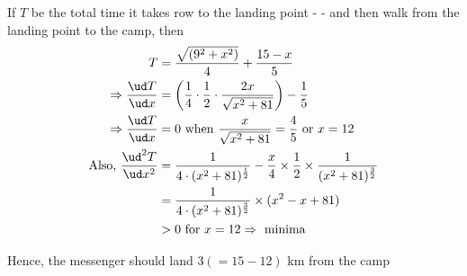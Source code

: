 \begin{solution}[\fullpage]
   If $T$ be the total time it takes row to the landing point - \asif - 
   and then walk from the landing point to the camp, then
   \begin{align}
       T &= \dfrac{\sqrt{(9^2+x^2)}}{4} + \dfrac{15-x}{5} \\
       \Rightarrow \dfrac{\ud T}{\ud x} &= \left( \dfrac{1}{4}\cdot\dfrac{1}{2}\cdot\dfrac{2x}{\sqrt{x^2+81}}\right) - \dfrac{1}{5} \\
       \Rightarrow \dfrac{\ud T}{\ud x} &= 0\text{ when } \dfrac{x}{\sqrt{x^2+81}} = \dfrac{4}{5}
       \text{ or } x = 12 \\
       \text{Also, }\dfrac{\ud^2 T}{\ud x^2} &= \dfrac{1}{4\cdot(x^2+81)^{\frac{1}{2}}} 
                         - \dfrac{x}{4}\times\dfrac{1}{2}\times\dfrac{1}{(x^2+81)^{\frac{3}{2}}} \\
                         &= \dfrac{1}{4\cdot(x^2+81)^{\frac{3}{2}}}\times(x^2-x+81) \\
                         &> 0 \text{ for } x = 12 \Rightarrow \text{ minima }
   \end{align}
   
   Hence, the messenger should land $3(= 15 -12)$ km from the camp
\end{solution}
